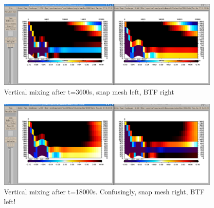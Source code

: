 \begin{figure}
\includegraphics[width=\textwidth]{interim-results/gravityWavesBTFsnapMidZoom3600.png}
\caption{Vertical mixing after t=3600s, snap mesh left, BTF right}
\label{fig:gw:mixing-3600s}
\end{figure}

\begin{figure}
\includegraphics[width=\textwidth]{interim-results/gravityWavesBTFsnapMidZoom18000.png}
\caption{Vertical mixing after t=18000s.  Confusingly, snap mesh right, BTF left!}
\label{fig:gw:mixing-18000s}
\end{figure}
